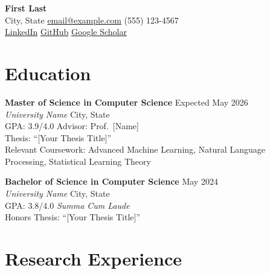 \documentclass[11pt,letterpaper]{article}
\begin{document}
\begin{center}
    {\LARGE\bfseries %
    First Last} \\[4pt]
    City, State \quad
    \href{mailto:email@example.com}{email@example.com} \quad
    (555) 123-4567 \\
    \href{https://linkedin.com/in/yourprofile}{LinkedIn} \quad
    \href{https://github.com/yourusername}{GitHub} \quad
    \href{https://scholar.google.com/citations?user=YOURID}{Google Scholar}
\end{center}

\section{Education}

\textbf{Master of Science in Computer Science} \hfill Expected May 2026 \\
\textit{University Name} \hfill City, State \\
GPA: 3.9/4.0 \quad Advisor: Prof.\ [Name] \\
Thesis: ``[Your Thesis Title]'' \\
Relevant Coursework: Advanced Machine Learning, Natural Language Processing, Statistical Learning Theory

\vspace{4pt}
\textbf{Bachelor of Science in Computer Science} \hfill May 2024 \\
\textit{University Name} \hfill City, State \\
GPA: 3.8/4.0 \quad \textit{Summa Cum Laude} \\
Honors Thesis: ``[Your Thesis Title]''

\section{Research Experience}
\end{document}
